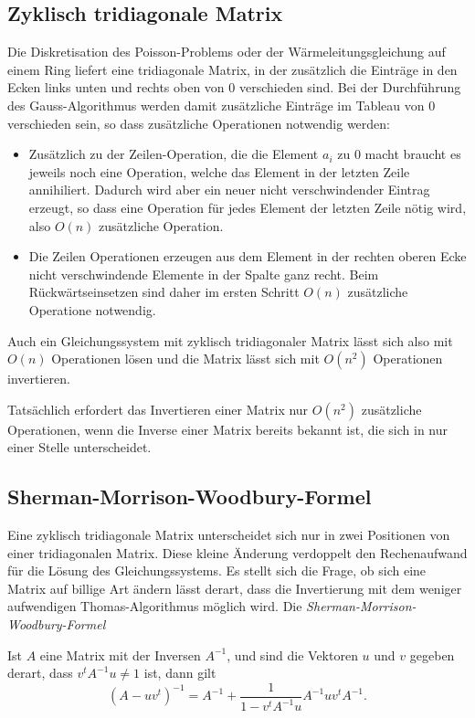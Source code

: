 \subsection{Zyklisch tridiagonale Matrix
\label{buch:subsection:zyklischtridiagonal}}
Die Diskretisation des Poisson-Problems oder der Wärmeleitungsgleichung
auf einem Ring liefert eine tridiagonale Matrix, in der zusätzlich die
Einträge in den Ecken links unten und rechts oben von $0$ verschieden sind.
Bei der Durchführung des Gauss-Algorithmus werden damit zusätzliche 
Einträge im Tableau von $0$ verschieden sein, so dass zusätzliche Operationen
notwendig werden:
\begin{itemize}
\item 
Zusätzlich zu der Zeilen-Operation, die die Element 
$a_i$ zu $0$ macht braucht es jeweils noch eine Operation, welche das
Element in der letzten Zeile annihiliert.
Dadurch wird aber ein neuer nicht verschwindender Eintrag erzeugt,
so dass eine Operation für jedes Element der letzten Zeile nötig wird,
also $O(n)$ zusätzliche Operation.
\item
Die Zeilen Operationen erzeugen aus dem Element in der rechten oberen
Ecke nicht verschwindende Elemente in der Spalte ganz recht.
Beim Rückwärtseinsetzen sind daher im ersten Schritt $O(n)$ 
zusätzliche Operatione notwendig.
\end{itemize}
Auch ein Gleichungssystem mit zyklisch tridiagonaler Matrix lässt sich also 
mit $O(n)$ Operationen lösen und die Matrix lässt sich mit $O(n^2)$
Operationen invertieren.

Tatsächlich erfordert das Invertieren einer Matrix nur $O(n^2)$
zusätzliche Operationen, wenn die Inverse einer Matrix bereits
bekannt ist, die sich in nur einer Stelle unterscheidet.

\subsection{Sherman-Morrison-Woodbury-Formel
\label{buch:subsection:sherman-morrison-woodbury-formel}}
Eine zyklisch tridiagonale Matrix unterscheidet sich nur in zwei 
Positionen von einer tridiagonalen Matrix.
Diese kleine Änderung verdoppelt den Rechenaufwand für die Lösung
des Gleichungssystems.
Es stellt sich die Frage, ob sich eine Matrix auf billige Art
ändern lässt derart, dass die Invertierung mit dem weniger
aufwendigen Thomas-Algorithmus möglich wird.
Die {\em Sherman-Morrison-Woodbury-Formel} 

\begin{satz}
\label{buch:satz:shermann}
Ist $A$ eine Matrix mit der Inversen $A^{-1}$, und sind die Vektoren
$u$ und $v$ gegeben derart, dass $v^tA^{-1}u\ne 1$ ist, dann gilt
\begin{equation}
(A-uv^t)^{-1}
=
A^{-1} + \frac{1}{1-v^tA^{-1}u} A^{-1}uv^tA^{-1}.
\label{buch:equation:shermann-morrison-woodburry}
\end{equation}
\end{satz}

